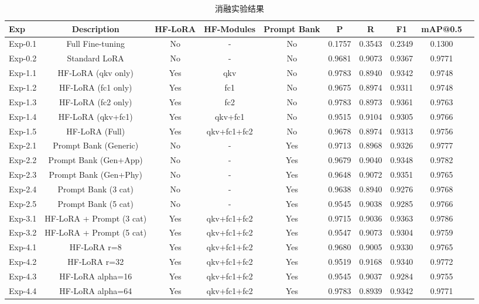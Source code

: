 \begin{table}[htbp]
\centering
\caption{消融实验结果}
\label{tab:ablation}
\begin{tabular}{lccccccccc}
\hline
Exp & Description & HF-LoRA & HF-Modules & Prompt Bank & P & R & F1 & mAP@0.5 \\
\hline
Exp-0.1 & Full Fine-tuning & No & - & No & 0.1757 & 0.3543 & 0.2349 & 0.1300 \\
Exp-0.2 & Standard LoRA & No & - & No & 0.9681 & 0.9073 & 0.9367 & 0.9771 \\
Exp-1.1 & HF-LoRA (qkv only) & Yes & qkv & No & 0.9783 & 0.8940 & 0.9342 & 0.9748 \\
Exp-1.2 & HF-LoRA (fc1 only) & Yes & fc1 & No & 0.9675 & 0.8974 & 0.9311 & 0.9748 \\
Exp-1.3 & HF-LoRA (fc2 only) & Yes & fc2 & No & 0.9783 & 0.8973 & 0.9361 & 0.9763 \\
Exp-1.4 & HF-LoRA (qkv+fc1) & Yes & qkv+fc1 & No & 0.9515 & 0.9104 & 0.9305 & 0.9766 \\
Exp-1.5 & HF-LoRA (Full) & Yes & qkv+fc1+fc2 & No & 0.9678 & 0.8974 & 0.9313 & 0.9756 \\
Exp-2.1 & Prompt Bank (Generic) & No & - & Yes & 0.9713 & 0.8968 & 0.9326 & 0.9777 \\
Exp-2.2 & Prompt Bank (Gen+App) & No & - & Yes & 0.9679 & 0.9040 & 0.9348 & 0.9782 \\
Exp-2.3 & Prompt Bank (Gen+Phy) & No & - & Yes & 0.9648 & 0.9072 & 0.9351 & 0.9765 \\
Exp-2.4 & Prompt Bank (3 cat) & No & - & Yes & 0.9638 & 0.8940 & 0.9276 & 0.9768 \\
Exp-2.5 & Prompt Bank (5 cat) & No & - & Yes & 0.9545 & 0.9038 & 0.9285 & 0.9766 \\
Exp-3.1 & HF-LoRA + Prompt (3 cat) & Yes & qkv+fc1+fc2 & Yes & 0.9715 & 0.9036 & 0.9363 & 0.9786 \\
Exp-3.2 & HF-LoRA + Prompt (5 cat) & Yes & qkv+fc1+fc2 & Yes & 0.9547 & 0.9073 & 0.9304 & 0.9759 \\
Exp-4.1 & HF-LoRA r=8 & Yes & qkv+fc1+fc2 & Yes & 0.9680 & 0.9005 & 0.9330 & 0.9765 \\
Exp-4.2 & HF-LoRA r=32 & Yes & qkv+fc1+fc2 & Yes & 0.9519 & 0.9168 & 0.9340 & 0.9772 \\
Exp-4.3 & HF-LoRA alpha=16 & Yes & qkv+fc1+fc2 & Yes & 0.9545 & 0.9037 & 0.9284 & 0.9755 \\
Exp-4.4 & HF-LoRA alpha=64 & Yes & qkv+fc1+fc2 & Yes & 0.9783 & 0.8939 & 0.9342 & 0.9771 \\
\hline
\end{tabular}
\end{table}
